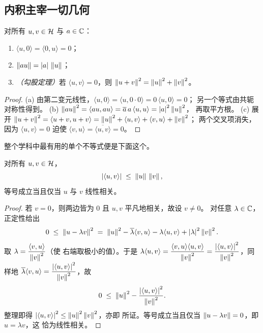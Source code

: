 \subsection{内积主宰一切几何}

\begin{proposition}[公理的初等推论]\label{prop:lec01-elem}
对所有 $u,v\in\mathcal{H}$ 与 $a\in\mathbb{C}$：
\begin{enumerate}[label=(\alph*)]
  \item $\langle u,0\rangle=\langle 0,u\rangle=0$；
  \item $\left\lVert a u \right\rVert=\left\lvert a \right\rvert\,\left\lVert u \right\rVert$；
  \item \emph{（勾股定理）}若 $\langle u,v\rangle=0$，则
        $\left\lVert u+v \right\rVert^{2}=\left\lVert u \right\rVert^{2}+\left\lVert v \right\rVert^{2}$。
\end{enumerate}
\end{proposition}

\begin{proof}
(a) 由第二变元线性，$\langle u,0\rangle=\langle u,0\cdot 0\rangle=0\,\langle u,0\rangle=0$；
另一个等式由共轭对称性得到。
(b) $\left\lVert a u \right\rVert^{2}=\langle a u,a u\rangle=\overline{a}\,a\,\langle u,u\rangle=\left\lvert a \right\rvert^{2}\left\lVert u \right\rVert^{2}$，
再取平方根。
(c) 展开 $\left\lVert u+v \right\rVert^{2}=\langle u+v,u+v\rangle=\left\lVert u \right\rVert^{2}+\langle u,v\rangle+\langle v,u\rangle+\left\lVert v \right\rVert^{2}$；
两个交叉项消失，因为 $\langle u,v\rangle=0$ 迫使
$\langle v,u\rangle=\overline{\langle u,v\rangle}=0$。
\end{proof}

整个学科中最有用的单个不等式便是下面这个。

\begin{theorem}[柯西--施瓦茨不等式]\label{thm:lec01-cs}
对所有 $u,v\in\mathcal{H}$，
\begin{equation}
  \left\lvert \langle u,v\rangle \right\rvert\;\le\;\left\lVert u \right\rVert\,\left\lVert v \right\rVert,
\end{equation}
等号成立当且仅当 $u$ 与 $v$ 线性相关。
\end{theorem}

\begin{proof}
若 $v=0$，则两边皆为 $0$ 且 $u,v$ 平凡地相关，故设 $v\neq0$。
对任意 $\lambda\in\mathbb{C}$，正定性给出
\[
  0\;\le\;\left\lVert u-\lambda v \right\rVert^{2}
   \;=\;\left\lVert u \right\rVert^{2}-\overline{\lambda}\langle v,u\rangle-\lambda\langle u,v\rangle+\left\lvert \lambda \right\rvert^{2}\left\lVert v \right\rVert^{2}.
\]
取 $\lambda=\dfrac{\langle v,u\rangle}{\left\lVert v \right\rVert^{2}}$（使
右端取极小的值）。于是 $\lambda\langle u,v\rangle=\dfrac{\langle v,u\rangle\langle u,v\rangle}{\left\lVert v \right\rVert^{2}}=\dfrac{\left\lvert \langle u,v\rangle \right\rvert^{2}}{\left\lVert v \right\rVert^{2}}$，同样地 $\overline{\lambda}\langle v,u\rangle=\dfrac{\left\lvert \langle u,v\rangle \right\rvert^{2}}{\left\lVert v \right\rVert^{2}}$，故
\[
  0\;\le\;\left\lVert u \right\rVert^{2}-\frac{\left\lvert \langle u,v\rangle \right\rvert^{2}}{\left\lVert v \right\rVert^{2}}.
\]
整理即得 $\left\lvert \langle u,v\rangle \right\rvert^{2}\le\left\lVert u \right\rVert^{2}\left\lVert v \right\rVert^{2}$，亦即
所证。等号成立当且仅当 $\left\lVert u-\lambda v \right\rVert=0$，即 $u=\lambda v$，这
恰为线性相关。
\end{proof}

